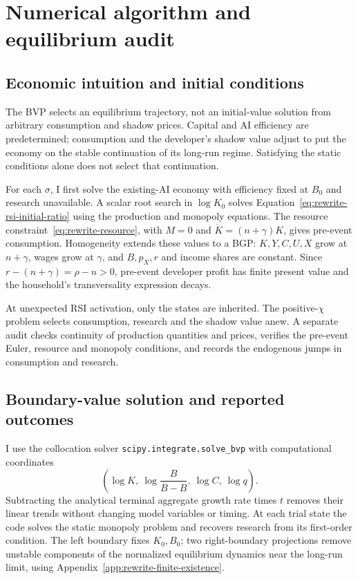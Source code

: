 \section{Numerical algorithm and equilibrium audit}
\label{app:rewrite-algorithm}

\subsection{Economic intuition and initial conditions}

The BVP selects an equilibrium trajectory, not an initial-value solution
from arbitrary consumption and shadow prices. Capital and AI efficiency
are predetermined; consumption and the developer's shadow value adjust
to put the economy on the stable continuation of its long-run regime.
Satisfying the static conditions alone does not select that continuation.

For each $\sigma$, I first solve the existing-AI economy with efficiency
fixed at $B_0$ and research unavailable. A scalar root search in $\log K_0$
solves Equation~\eqref{eq:rewrite-rsi-initial-ratio} using the production
and monopoly equations. The resource constraint~\eqref{eq:rewrite-resource},
with $M=0$ and $\dot K=(n+\gamma)K$, gives pre-event consumption.
Homogeneity extends these values to a BGP:
$K,Y,C,U,X$ grow at $n+\gamma$, wages grow at $\gamma$, and
$B,p_X,r$ and income shares are constant. Since
$r-(n+\gamma)=\rho-n>0$, pre-event developer profit has finite present
value and the household's transversality expression decays.

At unexpected RSI activation, only the states are inherited. The
positive-$\chi$ problem selects consumption, research and the shadow
value anew. A separate audit checks continuity of production quantities
and prices, verifies the pre-event Euler, resource and monopoly conditions,
and records the endogenous jumps in consumption and research.

\subsection{Boundary-value solution and reported outcomes}

I use the collocation solver \texttt{scipy.integrate.solve\_bvp} with
computational coordinates
\[
 \left(\log K,\ \log\frac{B}{\overline B-B},\ \log C,\ \log q\right).
\]
Subtracting the analytical terminal aggregate growth rate times $t$
removes their linear trends without changing model variables or timing.
At each trial state the code solves the static monopoly problem and
recovers research from its first-order condition. The left boundary fixes
$K_0,B_0$; two right-boundary projections remove unstable components of
the normalized equilibrium dynamics near the long-run limit, using
Appendix~\ref{app:rewrite-finite-existence}.

